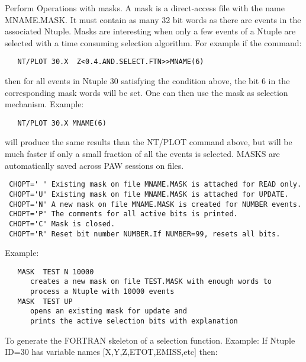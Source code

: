 \BEGARG
{}
\ENDARG
\BEGTEXT
Perform Operations with masks.
A mask is a direct-access file with the name MNAME.MASK.
It must contain as many 32 bit words as there are events
in the associated Ntuple.
Masks are interesting when only a few events of a Ntuple are selected
with a time consuming selection algorithm. For example if the command:
\begin{verbatim}
   NT/PLOT 30.X  Z<0.4.AND.SELECT.FTN>>MNAME(6)
\end{verbatim}
then for all events in Ntuple 30 satisfying the condition above,
the bit 6 in the corresponding mask words will be set. One can then use
the mask as selection mechanism. Example:
\begin{verbatim}
   NT/PLOT 30.X MNAME(6)
\end{verbatim}
will produce the same results than the NT/PLOT command above, but
will be much faster if only a small fraction of all the events
is selected.
MASKS are automatically saved across PAW sessions on files.
\begin{verbatim}
 CHOPT=' ' Existing mask on file MNAME.MASK is attached for READ only.
 CHOPT='U' Existing mask on file MNAME.MASK is attached for UPDATE.
 CHOPT='N' A new mask on file MNAME.MASK is created for NUMBER events.
 CHOPT='P' The comments for all active bits is printed.
 CHOPT='C' Mask is closed.
 CHOPT='R' Reset bit number NUMBER.If NUMBER=99, resets all bits.
\end{verbatim}
Example:
\begin{verbatim}
   MASK  TEST N 10000
      creates a new mask on file TEST.MASK with enough words to
      process a Ntuple with 10000 events
   MASK  TEST UP
      opens an existing mask for update and
      prints the active selection bits with explanation
\end{verbatim}
\ENDTEXT

\BEGARG
{}
\ENDARG
\BEGTEXT
To generate the FORTRAN skeleton of a selection function.
Example:
If Ntuple ID=30 has variable names [X,Y,Z,ETOT,EMISS,etc] then:

